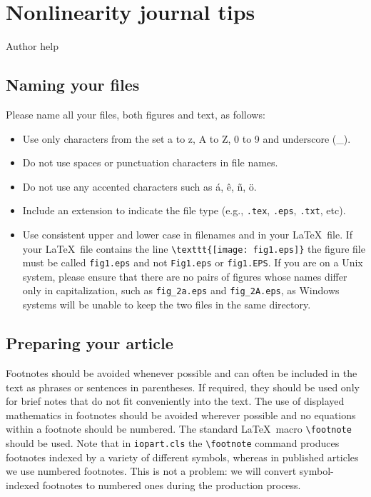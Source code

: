 
\section{Nonlinearity journal tips}
\label{sect:NonlinTips}

 {Author help}

\subsection{Naming your files}

Please name all your files, both figures and text, as follows:
\begin{itemize}
\item Use only characters from the set a to z, A to Z, 0 to 9 and underscore (\_).
\item Do not use spaces or punctuation characters in file names.
\item Do not use any accented characters such as
\'a, \^e, \~n, \"o.
\item Include an extension to indicate the file type (e.g., \verb".tex", \verb".eps", \verb".txt", etc).
\item Use consistent upper and lower case in filenames and in your \LaTeX\ file.
If your \LaTeX\ file contains the line \verb"\texttt{[image: fig1.eps]}" the figure file must be called
\verb"fig1.eps" and not \verb"Fig1.eps" or \verb"fig1.EPS".  If you are on a Unix system, please ensure that
there are no pairs of figures whose names differ only in capitalization, such as \verb"fig_2a.eps" and \verb"fig_2A.eps",
as Windows systems will be unable to keep the two files in the same directory.
\end{itemize}

\subsection{Preparing your article}

Footnotes should be avoided whenever possible and can often be included
in the text as phrases or sentences in parentheses. If required, they
should be used only for brief notes that do not fit conveniently into the
text. The use of displayed mathematics in footnotes should be avoided
wherever possible and no equations within a footnote should be numbered.
The standard \LaTeX\ macro \verb"\footnote" should be used.  Note that in
\verb"iopart.cls" the \verb"\footnote" command produces footnotes indexed
by a variety of different symbols, whereas in published articles we use
numbered footnotes.  This is not a problem: we will convert
symbol-indexed footnotes to numbered ones during the production process.

